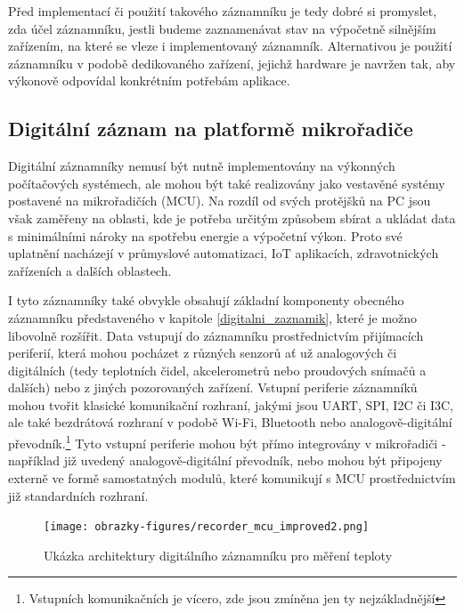Před implementací či použití takového záznamníku je tedy dobré si promyslet, zda účel záznamníku, jestli budeme zaznamenávat stav na výpočetně silnějším zařízením, na které se vleze i implementovaný záznamník. Alternativou je použití záznamníku v podobě dedikovaného zařízení, jejichž hardware je navržen tak, aby výkonově odpovídal konkrétním potřebám aplikace. 


\subsection{Digitální záznam na platformě mikrořadiče}
\label{digitalni_zaznamnik_mikroradic}
Digitální záznamníky nemusí být nutně implementovány na výkonných počítačových systémech, ale mohou být také realizovány jako vestavěné systémy postavené na mikrořadičích (MCU). Na rozdíl od svých protějšků na PC jsou však zaměřeny na oblasti, kde je potřeba určitým způsobem sbírat a ukládat data s minimálními nároky na spotřebu energie a výpočetní výkon. Proto své uplatnění nacházejí v průmyslové automatizaci, IoT aplikacích, zdravotnických zařízeních a dalších oblastech.

I tyto záznamníky také obvykle obsahují základní komponenty obecného záznamníku představeného v kapitole \ref{digitalni_zaznamik}, které je možno libovolně rozšířit. Data vstupují do záznamníku prostřednictvím přijímacích periferií, která mohou pocházet z různých senzorů ať už analogových či digitálních (tedy teplotních čidel, akcelerometrů nebo proudových snímačů a dalších) nebo z jiných pozorovaných zařízení. Vstupní periferie záznamníků mohou tvořit klasické komunikační rozhraní, jakými jsou UART, SPI, I2C či I3C, ale také bezdrátová rozhraní v podobě Wi-Fi, Bluetooth nebo analogově-digitální převodník.\footnote{Vstupních komunikačních je vícero, zde jsou zmíněna jen ty nejzákladnější} Tyto vstupní periferie mohou být přímo integrovány v mikrořadiči - například již uvedený analogově-digitální převodník, nebo mohou být připojeny externě ve formě samostatných modulů, které komunikují s MCU prostřednictvím již standardních rozhraní.

\begin{figure}[h]
    \centering
    \texttt{[image: obrazky-figures/recorder\_mcu\_improved2.png]}
    
    \caption{Ukázka architektury digitálního záznamníku pro měření teploty}
    \label{fig:mcu-recorder}
\end{figure}


